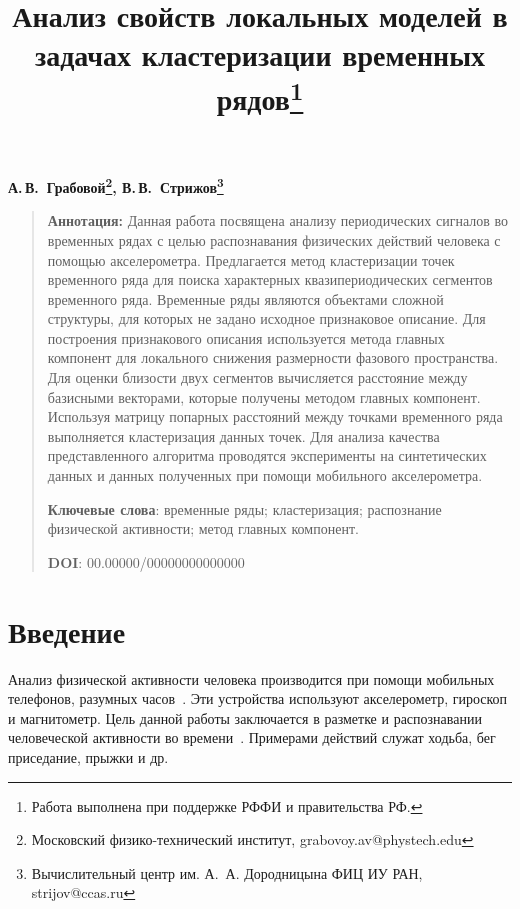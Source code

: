 \documentclass[12pt, twoside]{article}
\numberwithin{equation}{section}
\begin{document}
\title{\bf Анализ свойств локальных моделей в задачах кластеризации временных рядов\thanks{Работа выполнена при поддержке РФФИ и правительства РФ.}}
\date{}
\author{}
\maketitle

\begin{center}
\bf
А.\,В.~Грабовой\footnote{Московский физико-технический институт, grabovoy.av@phystech.edu}, В.\,В.~Стрижов\footnote{Вычислительный центр им. А.~А. Дородницына	ФИЦ ИУ РАН, strijov@ccas.ru}

\end{center}

{\centering\begin{quote}
\textbf{Аннотация:} Данная работа посвящена анализу периодических сигналов во временных рядах с целью распознавания физических действий человека с помощью акселерометра. Предлагается метод кластеризации точек временного ряда для поиска характерных квазипериодических сегментов временного ряда. Временные ряды являются объектами сложной структуры, для которых не задано исходное признаковое описание. Для построения признакового описания используется метода главных компонент для локального снижения размерности фазового пространства. Для оценки близости двух сегментов вычисляется расстояние между базисными векторами, которые получены методом главных компонент. Используя матрицу попарных расстояний между точками временного ряда выполняется кластеризация данных точек. Для анализа качества представленного алгоритма проводятся эксперименты на синтетических данных и данных полученных при помощи мобильного акселерометра.


\smallskip
\textbf{Ключевые слова}: временные ряды; кластеризация; распознание физической активности; метод главных компонент.

\smallskip
\textbf{DOI}: 00.00000/00000000000000
\end{quote}
}

\section{Введение}
Анализ физической активности человека производится при помощи мобильных телефонов, разумных часов~\cite{kwapisz2010, wang2014}. Эти устройства используют акселерометр, гироскоп и магнитометр. Цель данной работы заключается в  разметке и распознавании человеческой активности во времени~\cite{Ignatov2015, Olivares2012, cinar2018}. Примерами действий служат ходьба, бег приседание, прыжки и др.
\end{document}
